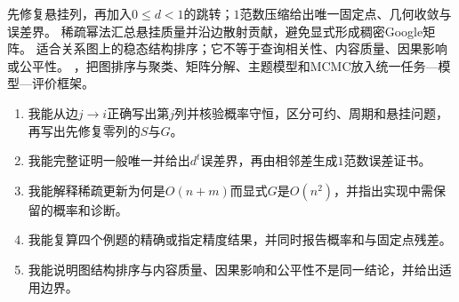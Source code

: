\begin{SLCompactClosure}
\label{struct:V5-C07-CH36}
{先修复悬挂列，再加入$0\le d<1$的跳转；$1$范数压缩给出唯一固定点、几何收敛与误差界。}
{稀疏幂法汇总悬挂质量并沿边散射贡献，避免显式形成稠密Google矩阵。}
{适合关系图上的稳态结构排序；它不等于查询相关性、内容质量、因果影响或公平性。}
{，把图排序与聚类、矩阵分解、主题模型和MCMC放入统一任务—模型—评价框架。}

\label{struct:V5-C07-CH37}
\begin{selfcheckbox}
\begin{enumerate}[leftmargin=2.2em,topsep=0.08\baselineskip,itemsep=0.08\baselineskip,parsep=0pt,partopsep=0pt]
  \item 我能从边$j\to i$正确写出第$j$列并核验概率守恒，区分可约、周期和悬挂问题，再写出先修复零列的$S$与$G$。
  \item 我能完整证明一般\PageRank{}唯一并给出$d^t$误差界，再由相邻差生成$1$范数误差证书。
  \item 我能解释稀疏更新为何是$O(n+m)$而显式$G$是$O(n^2)$，并指出实现中需保留的概率和诊断。
  \item 我能复算四个例题的精确或指定精度结果，并同时报告概率和与固定点残差。
  \item 我能说明图结构排序与内容质量、因果影响和公平性不是同一结论，并给出适用边界。
\end{enumerate}
\end{selfcheckbox}
\end{SLCompactClosure}
\endgroup
